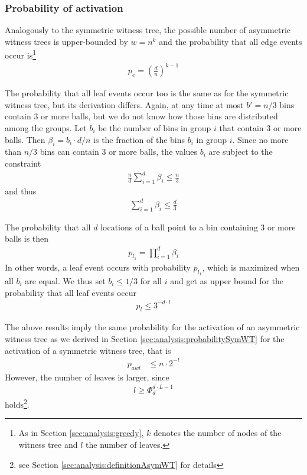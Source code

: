 \documentclass[a4paper,12pt]{article}
\begin{document}
\subsubsection{Probability of activation}
\label{sec:analysis:probabilityAsymWT}
Analogously to the symmetric witness tree, the possible number of asymmetric witness trees is upper-bounded by $w=n^k$ and the probability that all edge events occur is\footnote{As in Section \ref{sec:analysis:greedy}, $k$ denotes the number of nodes of the witness tree and $l$ the number of leaves.} 
\begin{align}
p_e = \left(\frac{d}{n}\right)^{k-1}
\end{align}

The probability that all leaf events occur too is the same as for the symmetric witness tree, but its derivation differs. Again, at any time at most $b'=n/3$ bins contain 3 or more balls, but we do not know how those bins are distributed among the groups. Let $b_i$ be the number of bins in group $i$ that contain 3 or more balls. Then $\beta_i = b_i\cdot d/ n$ is the fraction of the bins $b_i$ in group $i$. Since no more than $n/3$ bins can contain 3 or more balls, the values $b_i$ are subject to the constraint
\begin{align}
\frac{n}{d}\sum_{i=1}^d \beta_i \leq \frac{n}{3}
\end{align}
and thus 
\begin{align}
\sum_{i=1}^d \beta_i \leq \frac{d}{3}
\end{align}

The probability that all $d$ locations of a ball point to a bin containing 3 or more balls is then 
\begin{align}
p_{l_1} = \prod_{i=1}^{d} \beta_i
\end{align}
In other words, a leaf event occurs with probability $p_{l_1}$, which is maximized when all $b_i$ are equal. We thus set $b_i \leq 1/3$ for all $i$ and get as upper bound for the probability that all leaf events occur 
\begin{align}
p_l \leq 3^{-d\cdot l}
\end{align}

The above results imply the same probability for the activation of an asymmetric witness tree as we derived in Section \ref{sec:analysis:probabilitySymWT} for the activation of a symmetric witness tree, that is
\begin{align}
p_{awt} &\leq n \cdot 2^{-l}
\end{align}
However, the number of leaves is larger, since 
\begin{align}
l \geq \Phi_d^{d\cdot L -1}
\end{align}
holds\footnote{see Section \ref{sec:analysis:definitionAsymWT} for details}.
\end{document}
